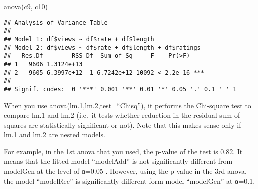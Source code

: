\documentclass[
]{article}
\newenvironment{Shaded}{\begin{snugshade}}{\end{snugshade}}
\newcommand{\FunctionTok}[1]{\textcolor[rgb]{0.00,0.00,0.00}{#1}}
\newcommand{\NormalTok}[1]{#1}
\begin{document}
\begin{Shaded}
\begin{Highlighting}[]
\FunctionTok{anova}\NormalTok{(c9, c10)}
\end{Highlighting}
\end{Shaded}

\begin{verbatim}
## Analysis of Variance Table
## 
## Model 1: df$views ~ df$rate + df$length
## Model 2: df$views ~ df$rate + df$length + df$ratings
##   Res.Df        RSS Df  Sum of Sq     F    Pr(>F)    
## 1   9606 1.3124e+13                                  
## 2   9605 6.3997e+12  1 6.7242e+12 10092 < 2.2e-16 ***
## ---
## Signif. codes:  0 '***' 0.001 '**' 0.01 '*' 0.05 '.' 0.1 ' ' 1
\end{verbatim}

When you use anova(lm.1,lm.2,test=``Chisq''), it performs the Chi-square
test to compare lm.1 and lm.2 (i.e.~it tests whether reduction in the
residual sum of squares are statistically significant or not). Note that
this makes sense only if lm.1 and lm.2 are nested models.

For example, in the 1st anova that you used, the p-value of the test is
0.82. It means that the fitted model ``modelAdd'' is not significantly
different from modelGen at the level of α=0.05 . However, using the
p-value in the 3rd anova, the model ``modelRec'' is significantly
different form model ``modelGen'' at α=0.1.
\end{document}
